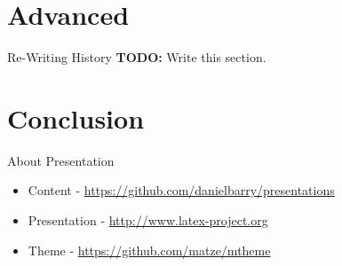 \documentclass{beamer}
\begin{document}
  \section{Advanced}
  \begin{frame}{Re-Writing History}
    \textbf{TODO:} Write this section.
  \end{frame}
  \section{Conclusion}
  \begin{frame}{About Presentation}
    \begin{itemize}
      \item Content - \url{https://github.com/danielbarry/presentations}
      \item Presentation - \url{http://www.latex-project.org}
      \item Theme - \url{https://github.com/matze/mtheme}
    \end{itemize}
  \end{frame}
\end{document}

